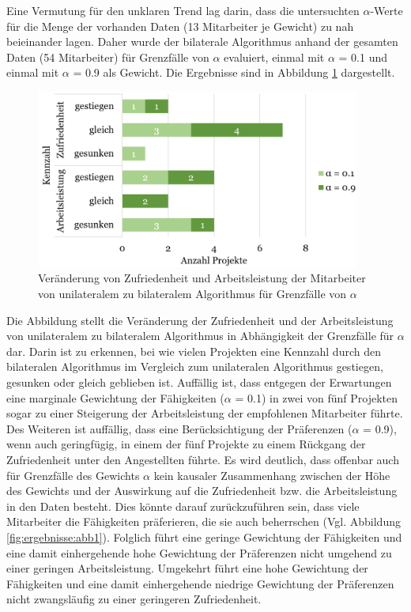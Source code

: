Eine Vermutung für den unklaren Trend lag darin, dass die untersuchten $\alpha$-Werte für die Menge der vorhanden Daten (13 Mitarbeiter je Gewicht) zu nah beieinander lagen.
Daher wurde der bilaterale Algorithmus anhand der gesamten Daten (54 Mitarbeiter) für Grenzfälle von $\alpha$ evaluiert, einmal mit $\alpha$ = 0.1 und einmal mit $\alpha$ = 0.9 als Gewicht.
Die Ergebnisse sind in Abbildung \ref{fig:diskussion:abb1} dargestellt.

\begin{figure}[H]
    \centering
	\includegraphics[width=0.95\textwidth]{gfx/verhaeltnis-z-a-projekte-edge-cases.png}
	\caption[Veränderung von Zufriedenheit und Arbeitsleistung der Mitarbeiter von unilateralem zu bilateralem Algorithmus für Grenzfälle von $\alpha$]{Veränderung von Zufriedenheit und Arbeitsleistung der Mitarbeiter von unilateralem zu bilateralem Algorithmus für Grenzfälle von $\alpha$}
	\label{fig:diskussion:abb1}
\end{figure}

Die Abbildung stellt die Veränderung der Zufriedenheit und der Arbeitsleistung von unilateralem zu bilateralem Algorithmus in Abhängigkeit der Grenzfälle für $\alpha$ dar.
Darin ist zu erkennen, bei wie vielen Projekten eine Kennzahl durch den bilateralen Algorithmus im Vergleich zum unilateralen Algorithmus gestiegen, gesunken oder gleich geblieben ist.
Auffällig ist, dass entgegen der Erwartungen eine marginale Gewichtung der Fähigkeiten ($\alpha$ = 0.1) in zwei von fünf Projekten sogar zu einer Steigerung der Arbeitsleistung der empfohlenen Mitarbeiter führte.
Des Weiteren ist auffällig, dass eine Berücksichtigung der Präferenzen ($\alpha$ = 0.9), wenn auch geringfügig, in einem der fünf Projekte zu einem Rückgang der Zufriedenheit unter den Angestellten führte.
Es wird deutlich, dass offenbar auch für Grenzfälle des Gewichts $\alpha$ kein kausaler Zusammenhang zwischen der Höhe des Gewichts und der Auswirkung auf die Zufriedenheit bzw. die Arbeitsleistung in den Daten besteht.
Dies könnte darauf zurückzuführen sein, dass viele Mitarbeiter die Fähigkeiten präferieren, die sie auch beherrschen (Vgl. Abbildung \ref{fig:ergebnisse:abb1}).
Folglich führt eine geringe Gewichtung der Fähigkeiten und eine damit einhergehende hohe Gewichtung der Präferenzen nicht umgehend zu einer geringen Arbeitsleistung.
Umgekehrt führt eine hohe Gewichtung der Fähigkeiten und eine damit einhergehende niedrige Gewichtung der Präferenzen nicht zwangsläufig zu einer geringeren Zufriedenheit.

